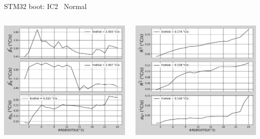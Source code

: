 \begin{frame}{STM32 boot: IC2 \textrightarrow\ Normal}
	\vspace{5mm}
	\begin{columns}
		\begin{column}{0.5\textwidth}
			\includegraphics[width=1.0\textwidth]{./figures/flistCircuit2_25_sl30_2beta0.pdf}
		\end{column}
		\begin{column}{0.5\textwidth}
			\includegraphics[width=1.0\textwidth]{./figures/flistCircuit2_25_sl30_2r2.pdf}
		\end{column}
	\end{columns}
\end{frame}

